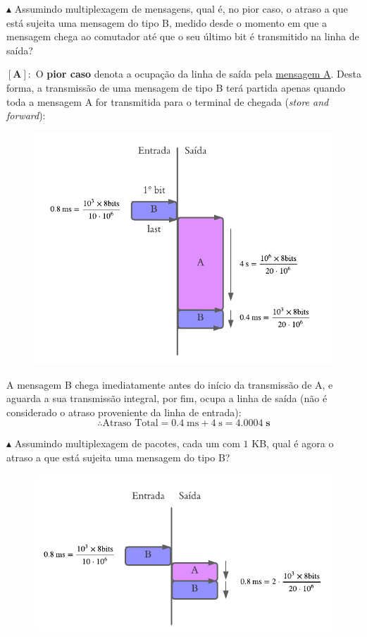 \vspace{-0.75 em}
\noindent $\blacktriangle$ Assumindo multiplexagem de mensagens, qual é, no pior caso, o atraso a que está sujeita uma mensagem do tipo B, medido desde o momento em que a mensagem chega ao comutador até que o seu último bit é transmitido na linha de saída?

\vspace{0.75 em}
\noindent $\pmb{[\textbf{A}]:}$ O \textbf{pior caso} denota a ocupação da linha de saída pela \underline{mensagem A}. Desta forma, a transmissão de uma mensagem de tipo B terá partida apenas quando toda a mensagem A for transmitida para o terminal de chegada (\textit{store and forward}):

\begin{figure}[H]
    \centering
    \includegraphics[width = 0.8\linewidth]{img/1/AtrasoB.png}
    \label{fig:AtrasoB}
\end{figure}

\noindent A mensagem B chega imediatamente antes do início da transmissão de A, e aguarda a sua transmissão integral, por fim, ocupa a linha de saída (não é considerado o atraso proveniente da linha de entrada):
$$
    \boxed{\therefore \text{Atraso Total} = 0.4\; \text{ms} + 4\; \text{s} = \pmb{4.0004}\; \textbf{s}}
$$

\clearpage
\noindent $\blacktriangle$ Assumindo multiplexagem de pacotes, cada um com $1$ KB, qual é agora o atraso a que está sujeita uma mensagem do tipo B?

\vspace{-0.5em}
\begin{figure}[H]
    \centering
    \includegraphics[width = 0.85\linewidth]{img/1/AtrasoBpacket.png}
    \label{fig:AtrasoBPacket}
\end{figure}

